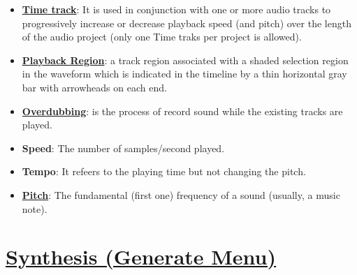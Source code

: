 \begin{itemize}
\item
  \href{http://manual.audacityteam.org/o/man/time_tracks.html}{\textbf{Time
    track}}: It is used in conjunction with one or more audio tracks to
  progressively increase or decrease playback speed (and pitch) over
  the length of the audio project (only one Time traks per project is
  allowed).

\item
  \href{http://manual.audacityteam.org/o/man/playing_and_recording.html}{\textbf{Playback
    Region}}: a track region associated with a shaded selection region
  in the waveform which is indicated in the timeline by a thin
  horizontal gray bar with arrowheads on each end.

\item
  \href{http://manual.audacityteam.org/o/man/faq_recording_how_to_s.html#overdub}{\textbf{Overdubbing}}:
  is the process of record sound while the existing tracks are played.

\item \textbf{Speed}: The number of samples/second played.

\item \textbf{Tempo}: It refeers to the playing time but not changing the pitch.

\item
  \href{http://manual.audacityteam.org/o/man/glossary.html#pitch}{\textbf{Pitch}}:
  The fundamental (first one) frequency of a sound (usually, a music
  note).

\end{itemize}

\chapter{\href{http://manual.audacityteam.org/o/man/index\_of\_effects\_generators\_and\_analyzers.html\#generators}{Synthesis (Generate Menu)}}

